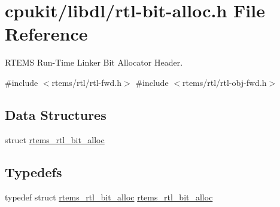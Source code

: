 \hypertarget{rtl-bit-alloc_8h}{}\section{cpukit/libdl/rtl-\/bit-\/alloc.h File Reference}
\label{rtl-bit-alloc_8h}


R\+T\+E\+MS Run-\/\+Time Linker Bit Allocator Header.  


{\ttfamily \#include $<$rtems/rtl/rtl-\/fwd.\+h$>$}\newline
{\ttfamily \#include $<$rtems/rtl/rtl-\/obj-\/fwd.\+h$>$}\newline
\subsection*{Data Structures}
\begin{DoxyCompactItemize}
\item 
struct \mbox{\hyperlink{structrtems__rtl__bit__alloc}{rtems\+\_\+rtl\+\_\+bit\+\_\+alloc}}
\end{DoxyCompactItemize}
\subsection*{Typedefs}
\begin{DoxyCompactItemize}
\item 
typedef struct \mbox{\hyperlink{structrtems__rtl__bit__alloc}{rtems\+\_\+rtl\+\_\+bit\+\_\+alloc}} \mbox{\hyperlink{rtl-bit-alloc_8h_a63f47aa162bf211a4abcb9825b966f75}{rtems\+\_\+rtl\+\_\+bit\+\_\+alloc}}
\end{DoxyCompactItemize}
